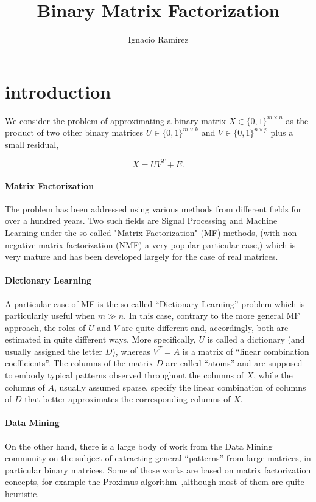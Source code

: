 \documentclass[a4paper,11pt]{article}
\title{Binary Matrix Factorization}
\author{Ignacio Ram\'{i}rez}
\begin{document}
\maketitle

\section{introduction}

We consider the problem of approximating a binary matrix $X \in \{0,1\}^{m{\times}n}$ as the product of two other binary matrices $U \in \{0,1\}^{m{\times}k}$ and $V \in \{0,1\}^{n{\times}p}$ plus a small residual,

\begin{equation}
X = UV^T + E.
\label{eq:mf}
\end{equation}

\paragraph{Matrix Factorization} The problem   has been addressed using various methods from different fields for over a hundred years. Two such fields are Signal Processing and Machine Learning under the so-called "Matrix Factorization" (MF) methods, (with non-negative matrix factorization (NMF) a very popular particular case,) which is very mature and has been developed largely for the case of real matrices.

\paragraph{Dictionary Learning} A particular case of MF is the so-called ``Dictionary Learning'' problem which is particularly useful when $m \gg n$. In this case, contrary to the more general MF approach, the roles of $U$ and $V$ are quite different and, accordingly, both are estimated in quite different ways. More specifically, $U$ is called a dictionary (and usually assigned the letter $D$), whereas $V^T=A$ is a matrix of ``linear combination coefficients''. The columns of the matrix $D$ are called ``atoms'' and are supposed to embody typical patterns observed throughout the columns of $X$, while the columns of $A$, usually assumed sparse, specify the linear combination of columns of $D$ that better approximates the corresponding columns of $X$.

\paragraph{Data Mining} On the other hand, there is a large body of work from the Data Mining community on the subject of extracting general ``patterns'' from large matrices, in particular binary matrices. Some of those works are based on matrix factorization concepts, for example the Proximus algorithm~\cite{proximus},although most of them are quite heuristic.
\end{document}
